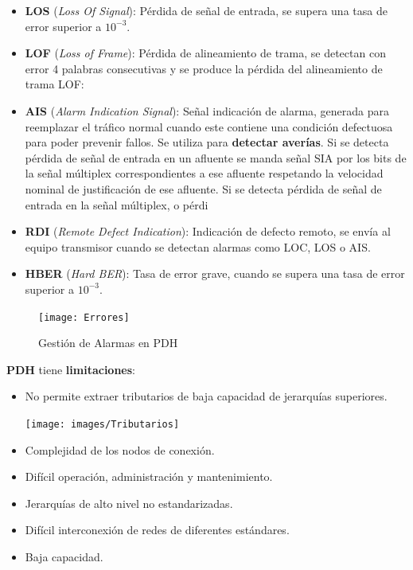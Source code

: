 \documentclass[10pt,portrait, twocolumn]{article}
\begin{document}
	\begin{itemize}
		\item \textbf{LOS} (\textit{Loss Of Signal}): Pérdida de señal de entrada, se supera una tasa de error superior a $10^{-3}$.
		\item \textbf{LOF} (\textit{Loss of Frame}): Pérdida de alineamiento de trama, se detectan con error 4 palabras consecutivas y se produce la pérdida del alineamiento de trama LOF:
		\item \textbf{AIS} (\textit{Alarm Indication Signal}): Señal indicación de alarma, generada para reemplazar el tráfico normal cuando este contiene una condición defectuosa para poder prevenir fallos. Se utiliza para \textbf{detectar averías}. Si se detecta pérdida de señal de entrada en un afluente se manda señal SIA por los bits de la señal múltiplex correspondientes a ese afluente respetando la velocidad nominal de justificación de ese afluente. Si se detecta pérdida de señal de entrada en la señal múltiplex, o pérdi
		\item \textbf{RDI} (\textit{Remote Defect Indication}): Indicación de defecto remoto, se envía al equipo transmisor cuando se detectan alarmas como LOC, LOS o AIS.
		\item \textbf{HBER} (\textit{Hard BER}): Tasa de error grave, cuando se supera una tasa de error superior a $10^{-3}$.
	\end{itemize}

\begin{figure}[!ht]
	\centering
     \texttt{[image: Errores]}
      \caption{Gestión de Alarmas en PDH}
      \label{fig:Regiones de frecuencias}
\end{figure}

\textbf{PDH} tiene \textbf{limitaciones}:

	\begin{itemize}
	\item No permite extraer tributarios de baja capacidad de jerarquías superiores.
	
		\begin{center}
			\texttt{[image: images/Tributarios]}
		\end{center}
	\item Complejidad de los nodos de conexión.
	\item Difícil operación, administración y mantenimiento.
	\item Jerarquías de alto nivel no estandarizadas.
	\item Difícil interconexión de redes de diferentes estándares.
	\item Baja capacidad.
	\end{itemize}
	
\end{document}

